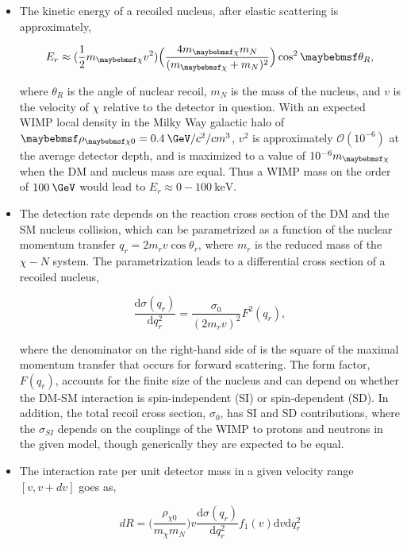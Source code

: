 \begin{itemize}
\item The kinetic energy of a recoiled nucleus, after elastic scattering is approximately,

\begin{equation}
  E_{r} \approx (\frac{1}{2}\mDM v^2)\Big(\frac{4\mDM m_N}{(\mDM + m_N)^2}\Big)\cos^2{\theta_R},
  \label{eq:kinE}
\end{equation}

where $\theta_R$ is the angle of nuclear recoil, $m_N$ is the mass of the nucleus, and $v$ is the velocity of $\chi$ relative to the detector in question. With an expected WIMP local density in the Milky Way galactic halo of $\rho_{\chi 0}=0.4\:\GeV/c^2/cm^3$, $v^2$ is approximately $\mathcal{O}(10^{-6})$ at the average detector depth, and  is maximized to a value of $10^{-6}\mDM$ when the DM and nucleus mass are equal. Thus a WIMP mass on the order of $100\:\GeV$ would lead to $E_r \approx 0-100\:\mathrm{keV}$.

\item The detection rate depends on the reaction cross section of the DM and the SM nucleus collision, which can be parametrized as a function of the nuclear momentum transfer $q_r = 2m_rv\cos\theta_r$, where $m_r$ is the reduced mass of the $\chi-N$ system. The parametrization leads to a differential cross section of a recoiled nucleus,

\begin{equation}
  \frac{\mathrm{d}\sigma(q_r)}{\mathrm{d} q_r^2} = \frac{\sigma_0}{(2m_r v)^2}F^2(q_r),
\label{eq:diffxsec}
\end{equation}

where the denominator on the right-hand side of  is the square of the maximal momentum transfer that occurs for forward scattering. The form factor, $F(q_r)$, accounts for the finite size of the nucleus and can depend on whether the DM-SM interaction is spin-independent (SI) or spin-dependent (SD). In addition, the total recoil cross section, $\sigma_0$, has SI and SD contributions, where the $\sigma_{SI}$ depends on the couplings of the WIMP to protons and neutrons in the given model, though generically they are expected to be equal.

\item The interaction rate per unit detector mass in a given velocity range $[v,v+dv]$ goes as,

\begin{equation}
  dR = \Big(\frac{\rho_{\chi 0}}{m_\chi m_N}\Big) v \frac{\mathrm{d}\sigma(q_r)}{\mathrm{d} q_r^2} f_1(v)\mathrm{d}v\mathrm{d}q_r^2
\label{eq:DDrate}
\end{equation}


\end{itemize}
